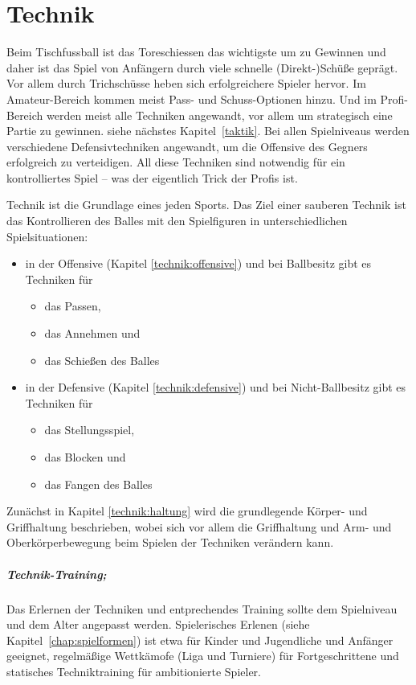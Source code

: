 \chapter{Technik}
\label{technik}

Beim Tischfussball ist das Toreschiessen das wichtigste um zu Gewinnen und daher ist das Spiel von Anfängern durch viele schnelle (Direkt-)Schüße geprägt.
Vor allem durch Trichschüsse heben sich erfolgreichere Spieler hervor.
Im Amateur-Bereich kommen meist Pass- und Schuss-Optionen hinzu.
Und im Profi-Bereich werden meist alle Techniken angewandt, vor allem um strategisch eine Partie zu gewinnen. siehe nächstes Kapitel~\ref{taktik}. 
Bei allen Spielniveaus werden verschiedene Defensivtechniken angewandt, um die Offensive des Gegners erfolgreich zu verteidigen.
All diese Techniken sind notwendig für ein kontrolliertes Spiel -- was der eigentlich Trick der Profis ist.

Technik ist die Grundlage eines jeden Sports. 
Das Ziel einer sauberen Technik ist das Kontrollieren des Balles mit den Spielfiguren in unterschiedlichen Spielsituationen:
\begin{itemize}
    \item in der Offensive (Kapitel \ref{technik:offensive}) und bei Ballbesitz gibt es Techniken für 
        \begin{itemize}
            \item das Passen, 
            \item das Annehmen und 
            \item das Schießen des Balles
        \end{itemize}
    \item in der Defensive (Kapitel \ref{technik:defensive}) und bei Nicht-Ballbesitz gibt es Techniken für 
        \begin{itemize}
            \item das Stellungsspiel, 
            \item das Blocken und 
            \item das Fangen des Balles  
        \end{itemize}
\end{itemize}
Zunächst in Kapitel \ref{technik:haltung} wird die grundlegende Körper- und Griffhaltung beschrieben, wobei sich vor allem die Griffhaltung und Arm- und Oberkörperbewegung beim Spielen der Techniken verändern kann. 

\paragraph{Technik-Training;} 
Das Erlernen der Techniken und entprechendes Training sollte dem Spielniveau und dem Alter angepasst werden. 
Spielerisches Erlenen (siehe Kapitel~\ref{chap:spielformen}) ist etwa für Kinder und Jugendliche und Anfänger geeignet, regelmäßige Wettkämofe (Liga und Turniere) für Fortgeschrittene und statisches Techniktraining für ambitionierte Spieler.


